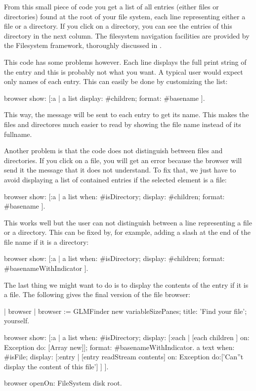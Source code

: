 \documentclass[a4paper,10pt,twoside]{book}
\begin{document}
From this small piece of code you get a list of all entries (either
files or directories) found at the root of your file system, each line
representing either a file or a directory. If you click on a
directory, you can see the entries of this directory in the next
column. The filesystem navigation facilities are provided by the
Filesystem framework, thoroughly discussed in .

This code has some problems however. Each line displays the full print
string of the entry and this is probably not what you want. A typical
user would expect only names of each entry. This can easily be done by
customizing the list:

\begin{code}{}
browser	show: [:a | 
   a list
  	  display: #children;
  	  format: #basename ].
\end{code}

This way, the message  will be sent to each entry to get its
name. This makes the files and directores much easier to read by showing the file name instead of its fullname.

Another problem is that the code does not distinguish between files
and directories. If you click on a file, you will get an error because
the browser will send it the message  that it does not
understand. To fix that, we just have to avoid displaying a list of
contained entries if the selected element is a file:

\begin{code}{}
browser show: [:a | 
   a list
  	  when: #isDirectory;
  	  display: #children;
  	  format: #basename ].
\end{code}

This works well but the user can not distinguish between a line
representing a file or a directory. This can be fixed by, for example,
adding a slash at the end of the file name if it is a directory:

\begin{code}{}
browser show: [:a | 
  a list
  	 when: #isDirectory;
  	 display: #children;
  	 format: #basenameWithIndicator ].
\end{code}

The last thing we might want to do is to display the contents of the
entry if it is a file. The following gives the final version of the
file browser:
\begin{code}{}
| browser |
browser := GLMFinder new
  variableSizePanes;
  title: 'Find your file';
  yourself.

browser show: [:a |
        a list
                when: #isDirectory;
                display: [:each | [each children ]
                                on: Exception
                                do: [Array new]];
                format: #basenameWithIndicator.
        a text
                when: #isFile;
                display: [:entry | [entry readStream contents]
                            on: Exception
                                do:['Can''t display the content of this file'] ] ].

browser openOn: FileSystem disk root.
\end{code}     
                        
\end{document}
